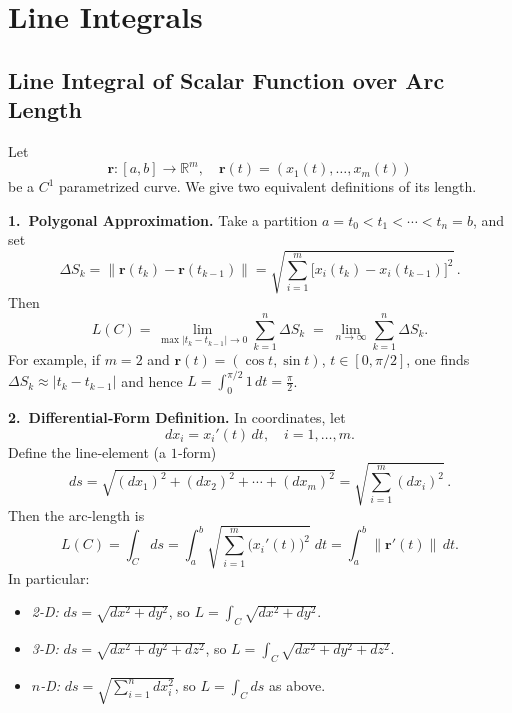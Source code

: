 \documentclass[11pt,openany]{article}
\begin{document}
\newpage
\section*{Line Integrals}
\subsection*{Line Integral of Scalar Function over Arc Length}

Let 
\[
\mathbf r\colon [a,b]\to\mathbb R^m,\quad
\mathbf r(t)=(x_1(t),\dots,x_m(t))
\]
be a $C^1$ parametrized curve.  We give two equivalent definitions of its length.

\bigskip

\noindent\textbf{1.\ Polygonal Approximation.}  Take a partition 
\(
a=t_0<t_1<\cdots<t_n=b
\),
and set
\[
\Delta S_k
=\bigl\|\mathbf r(t_k)-\mathbf r(t_{k-1})\bigr\|
=\sqrt{\sum_{i=1}^m\bigl[x_i(t_k)-x_i(t_{k-1})\bigr]^2}\,.
\]
Then
\[
L(C)
=\lim_{\max|t_k-t_{k-1}|\to0}
\sum_{k=1}^n\Delta S_k
\;=\;
\lim_{n\to\infty}\sum_{k=1}^n\Delta S_k.
\]
For example, if $m=2$ and 
\(\mathbf r(t)=(\cos t,\sin t)\), $t\in[0,\pi/2]$, one finds 
\(\Delta S_k\approx|t_k-t_{k-1}|\) and hence 
$L=\int_0^{\pi/2}1\,dt=\tfrac\pi2$.

\bigskip

\noindent\textbf{2.\ Differential‐Form Definition.}  In coordinates, let
\[
dx_i = x_i'(t)\,dt,
\quad
i=1,\dots,m.
\]
Define the line‐element (a $1$‐form)
\[
ds
=\sqrt{(dx_1)^2+(dx_2)^2+\cdots+(dx_m)^2}
=\sqrt{\sum_{i=1}^m (dx_i)^2}\,.
\]
Then the arc‐length is
\[
L(C)
=\int_C ds
=\int_a^b \sqrt{\sum_{i=1}^m \bigl(x_i'(t)\bigr)^2}\;dt
=\int_a^b \bigl\|\mathbf r'(t)\bigr\|\,dt.
\]
In particular:
\begin{itemize}
	\item \emph{2-D:} $ds=\sqrt{dx^2+dy^2}$, so 
	$L=\int_C\sqrt{dx^2+dy^2}$.  
	
	\item \emph{3-D:} $ds=\sqrt{dx^2+dy^2+dz^2}$, so 
	$L=\int_C\sqrt{dx^2+dy^2+dz^2}$.
	
	\item \emph{$n$-D:} $ds=\sqrt{\sum_{i=1}^n dx_i^2}$, so 
	$L=\int_Cds$ as above.
\end{itemize}

\bigskip
\end{document}
